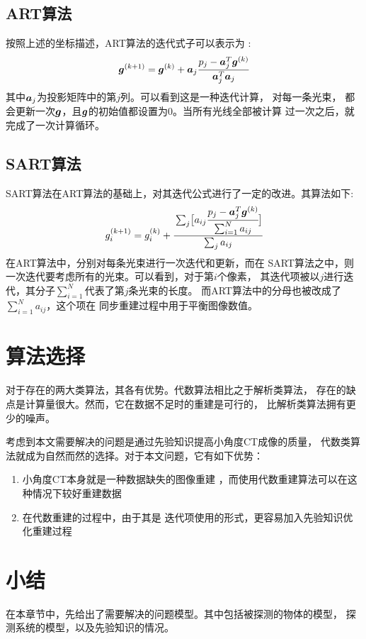 \subsection{ART算法}
按照上述的坐标描述，ART算法的迭代式子可以表示为\cite{gordon1974tutorial}
\cite{gordon1970algebraic}\cite{herman1973art}:
\begin{equation}
\bm{g}^{(k+1)}=\bm{g}^{(k)}+\bm{a}_j\cfrac{p_j-\bm{a}^T_j\bm{g}^{(k)}}{\bm{a}^T_j\bm{a}_j}
\end{equation}
其中$\bm{a}_j$为投影矩阵中的第$j$列。可以看到这是一种迭代计算，
对每一条光束，
都会更新一次$\bm{g}$，且$\bm{g}$的初始值都设置为$0$。当所有光线全部被计算
过一次之后，就完成了一次计算循环。
\subsection{SART算法}
SART算法在ART算法的基础上，对其迭代公式进行了一定的改进。其算法如下\cite{andersen1984simultaneous}:
\begin{equation}
g_i^{(k+1)}=g_i^{(k)}+\cfrac{\sum_j\bigl[a_{ij}\cfrac{p_j-\bm{a}^T_j\bm{g}^{(k)}}{\sum^N_{i=1}a_{ij}}\bigr]}{\sum_ja_{ij}}
\end{equation}
在ART算法中，分别对每条光束进行一次迭代和更新，而在
SART算法之中，则一次迭代要考虑所有的光束。可以看到，对于第$i$个像素，
其迭代项被以$j$进行迭代，其分子$\sum^N_{i=1}$代表了第$j$条光束的长度。
而ART算法中的分母也被改成了$\sum^N_{i=1}a_{ij}$，这个项在
同步重建过程中用于平衡图像数值。
\section{算法选择}
对于存在的两大类算法，其各有优势。代数算法相比之于解析类算法，
存在的缺点是计算量很大。然而，它在数据不足时的重建是可行的，
比解析类算法拥有更少的噪声。

考虑到本文需要解决的问题是通过先验知识提高小角度CT成像的质量，
代数类算法就成为自然而然的选择。对于本文问题，它有如下优势：
\begin{enumerate}
\item 小角度CT本身就是一种数据缺失的图像重建
，而使用代数重建算法可以在这种情况下较好重建数据
\item 在代数重建的过程中，由于其是
迭代项使用的形式，更容易加入先验知识优化重建过程
\end{enumerate}
\section{小结}
在本章节中，先给出了需要解决的问题模型。其中包括被探测的物体的模型，
探测系统的模型，以及先验知识的情况。


